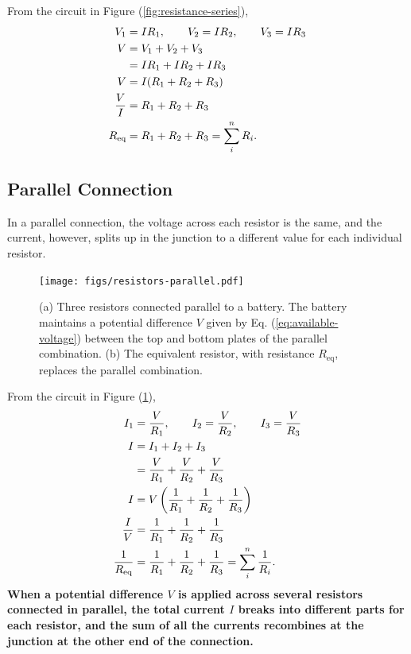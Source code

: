 \documentclass[12pt,b4paper]{article}
\begin{document}
From the circuit in Figure (\ref{fig:resistance-series}),
\begin{align}
    V_1&=IR_1,\qquad V_2=IR_2,\qquad V_3=IR_3\\
    V&=V_1+V_2+V_3\notag\\
    &=IR_1+IR_2+IR_3\notag\\
    V&=I(R_1+R_2+R_3)\notag\\
    \frac{V}{I}&=R_1+R_2+R_3\notag\\
    R_\text{eq}&=R_1+R_2+R_3=\sum_i^n{R_i}.
\end{align}
\subsection{Parallel Connection}
In a parallel connection, the voltage across each resistor is the same, and the current, however, splits up in the junction to a different value for each individual resistor.
\begin{figure}[H]
    \centering
    \texttt{[image: figs/resistors-parallel.pdf]}
    \caption{(a) Three resistors connected parallel to a battery. The battery maintains a potential difference $V$ given by Eq. (\ref{eq:available-voltage}) between the top and bottom plates of the parallel combination. (b) The equivalent resistor, with resistance $R_\text{eq}$, replaces the parallel combination.}
    \label{fig:resistance-parallel}
\end{figure}
From the circuit in Figure (\ref{fig:resistance-parallel}),
\begin{align}
    I_1&=\frac{V}{R_1},\qquad I_2=\frac{V}{R_2},\qquad I_3=\frac{V}{R_3}\\
    I&=I_1+I_2+I_3\notag\\
    &=\frac{V}{R_1}+\frac{V}{R_2}+\frac{V}{R_3}\notag\\
    I&=V\left(\frac{1}{R_1}+\frac{1}{R_2}+\frac{1}{R_3}\right)\notag\\
    \frac{I}{V}&=\frac{1}{R_1}+\frac{1}{R_2}+\frac{1}{R_3}\notag\\
    \frac{1}{R_\text{eq}}&=\frac{1}{R_1}+\frac{1}{R_2}+\frac{1}{R_3}=\sum_i^n\frac{1}{R_i}.
\end{align}
\textbf{When a potential difference $V$ is applied across several resistors connected in parallel, the total current $I$ breaks into different parts for each resistor, and the sum of all the currents recombines at the junction at the other end of the connection.}
\end{document}
